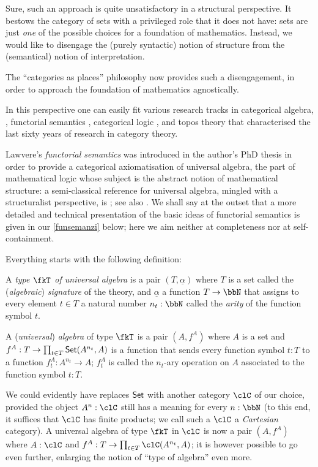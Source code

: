 Sure, such an approach is quite unsatisfactory in a structural perspective. It bestows the category of sets with a privileged role that it does not have: sets are just \emph{one} of the possible choices for a foundation of mathematics. Instead, we would like to disengage the (purely syntactic) notion of structure from the (semantical) notion of interpretation.

The ``categories as places'' philosophy now provides such a disengagement, in order to approach the foundation of mathematics agnostically.%

In this perspective one can easily fit various research tracks in categorical algebra, \cite{Janelidze2004}, functorial semantics \cite{lawvere1963functorial,hyland2007category}, categorical logic \cite{lambek1988introduction}, and topos theory \cite{JohnstonePT} that characterised the last sixty years of research in category theory.

Lawvere's \emph{functorial semantics} was introduced in the author's PhD thesis \cite{lawvere1963functorial} in order to provide a categorical axiomatisation of universal algebra, the part of mathematical logic whose subject is the abstract notion of mathematical structure: a semi-classical reference for universal algebra, mingled with a structuralist perspective, is \cite{manes2012algebraic}; see also \cite{sankappanavar}. We shall say at the outset that a more detailed and technical presentation of the basic ideas of functorial semantics is given in our \autoref{funsemanzi} below; here we aim neither at completeness nor at self-containment.

Everything starts with the following definition:
\begin{definition}\label{unialg}
	A \emph{type $\fkT$ of universal algebra} is a pair $(T,\underline{\alpha})$ where $T$ is a set called the (\emph{algebraic}) \emph{signature} of the theory, and $\underline\alpha$ a function $T \to \bbN$ that assigns to every element $t\in T$ a natural number $n_t : \bbN$ called the \emph{arity} of the function symbol $t$.
\end{definition}
\begin{definition}
	A (\emph{universal}) \emph{algebra} of type $\fkT$ is a pair $(A,f^A)$ where $A$ is a set and $f^A : T \to \prod_{t\in T} \mathsf{Set}(A^{n_t},A )$ is a function that sends every function symbol $t : T$ to a function $f^A_t : A^{n_t} \to A$; $f^A_t$ is called the $n_t$-ary operation on $A$ associated to the function symbol $t : T$.
\end{definition}
We could evidently have replaces $\mathsf{Set}$ with another category $\clC$ of our choice, provided the object $A^n : \clC$ still has a meaning for every $n : \bbN$ (to this end, it suffices that $\clC$ has finite products; we call such a $\clC$ a \emph{Cartesian} category). A universal algebra of type $\fkT$ in $\clC$ is now a pair $(A,f^A)$ where $A : \clC$ and $f^A : T \to \prod_{t\in T} \clC(A^{n_t},A )$; it is however possible to go even further, enlarging the notion of ``type of algebra'' even more.

